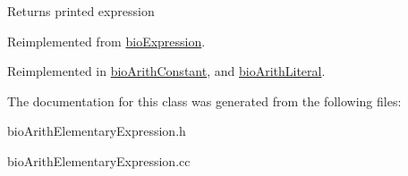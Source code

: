 \begin{DoxyReturn}{Returns}
printed expression 
\end{DoxyReturn}


Reimplemented from \hyperlink{classbio_expression_a66a83eb0caac18dd5e568ffde5a8b5d4}{bio\+Expression}.



Reimplemented in \hyperlink{classbio_arith_constant_a50fd07c61fc6674c05f23345b972807c}{bio\+Arith\+Constant}, and \hyperlink{classbio_arith_literal_ae55e7cbd7d3561b56af50fc741009a60}{bio\+Arith\+Literal}.



The documentation for this class was generated from the following files\+:\begin{DoxyCompactItemize}
\item 
bio\+Arith\+Elementary\+Expression.\+h\item 
bio\+Arith\+Elementary\+Expression.\+cc\end{DoxyCompactItemize}
